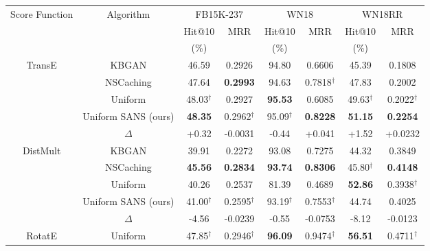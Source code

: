 \begin{table*}[h]
\begin{small}
\centering
\begin{tabular}{cccccccc}
\hline
\multirow{3}{2cm}{\centering Score Function}& \multirow{3}{2cm}{Algorithm} & \multicolumn{2}{c}{FB15K-237} & \multicolumn{2}{c}{WN18} & \multicolumn{2}{c}{WN18RR} \\
& & Hit@10 & \multirow{2}{1cm}{\centering MRR} & Hit@10 & \multirow{2}{1cm}{\centering MRR} & Hit@10 & \multirow{2}{1cm}{\centering MRR} \\ 
& & (\%) & & (\%) & & (\%) & \\
\hline
\multirow{5}{1.5cm}{\centering TransE} & KBGAN \cite{cai2017kbgan} & 46.59 & 0.2926 & 94.80 & 0.6606 & 45.39 & 0.1808 \\
& NSCaching \cite{zhang2019nscaching} & 47.64 & \textbf{0.2993} & 94.63 & 0.7818$^\dagger$ & 47.83 & 0.2002\\
& Uniform \cite{sun2019rotate} & 48.03$^\dagger$ & 0.2927 & \textbf{95.53} & 0.6085 & 49.63$^\dagger$ & 0.2022$^\dagger$ \\
& Uniform SANS (ours) & \textbf{48.35} & 0.2962$^\dagger$ & 95.09$^\dagger$ & \textbf{0.8228} & \textbf{51.15} & \textbf{0.2254} \\
& $\Delta$ & \cellcolor{celadon}+0.32 & \cellcolor{mistyrose}-0.0031 & \cellcolor{mistyrose}-0.44 &	\cellcolor{celadon}+0.041 & \cellcolor{celadon}+1.52	& \cellcolor{celadon}+0.0232 \\
\hline
\multirow{5}{1.5cm}{\centering DistMult} & KBGAN & 39.91 & 0.2272 & 93.08 & 0.7275 & 44.32 & 0.3849 \\
& NSCaching & \textbf{45.56} & \textbf{0.2834} & \textbf{93.74} & \textbf{0.8306} & 45.80$^\dagger$ & \textbf{0.4148} \\
& Uniform & 40.26 & 0.2537 & 81.39  & 0.4689 & \textbf{52.86} & 0.3938$^\dagger$ \\
& Uniform SANS (ours) & 41.00$^\dagger$ & 0.2595$^\dagger$ & 93.19$^\dagger$ & 0.7553$^\dagger$ & 44.74 & 0.4025 \\
& $\Delta$ & \cellcolor{mistyrose}-4.56 & \cellcolor{mistyrose}-0.0239 & \cellcolor{mistyrose}-0.55 & \cellcolor{mistyrose}-0.0753 &	\cellcolor{mistyrose}-8.12 & \cellcolor{mistyrose}-0.0123 \\
\hline
\multirow{3}{1cm}{\centering RotatE} & Uniform & 47.85$^\dagger$ & 0.2946$^\dagger$ & \textbf{96.09} & 0.9474$^\dagger$ & \textbf{56.51} & 0.4711$^\dagger$ \\

\end{tabular}
\end{small}
\end{table*}
